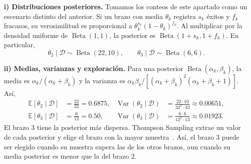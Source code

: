 \textbf{i) Distribuciones posteriores.}
Tomamos los conteos de este apartado como un escenario distinto del
anterior. Si un brazo con media $\theta_k$ registra $s_k$ éxitos y
$f_k$ fracasos, su verosimilitud es proporcional a
$\theta_k^{s_k}(1-\theta_k)^{f_k}$. Al multiplicar por la densidad
uniforme de $\operatorname{Beta}(1,1)$, la posterior es
$\operatorname{Beta}(1+s_k,1+f_k)$. En particular,
\[
    \theta_2\mid\mathcal{D}\sim\operatorname{Beta}(22,10),
    \qquad
    \theta_3\mid\mathcal{D}\sim\operatorname{Beta}(6,6).
\]

\textbf{ii) Medias, varianzas y exploración.}
Para una posterior $\operatorname{Beta}(\alpha_k,\beta_k)$, la media
es $\alpha_k/(\alpha_k+\beta_k)$ y la varianza es
$\alpha_k\beta_k/[(\alpha_k+\beta_k)^2(\alpha_k+\beta_k+1)]$. Así,
\begin{align*}
    \mathbb{E}[\theta_2\mid\mathcal{D}]&=\frac{22}{32}=0.6875,
    &\operatorname{Var}(\theta_2\mid\mathcal{D})
    &=\frac{22\cdot 10}{32^2\cdot 33}\approx 0.00651,\\
    \mathbb{E}[\theta_3\mid\mathcal{D}]&=\frac{6}{12}=0.50,
    &\operatorname{Var}(\theta_3\mid\mathcal{D})
    &=\frac{6\cdot 6}{12^2\cdot 13}\approx 0.01923.
\end{align*}
El brazo $3$ tiene la posterior más dispersa. Thompson Sampling
extrae un valor de cada posterior y elige el brazo con la mayor
muestra~\cite[cap.~36]{lattimore2020}. Así, el brazo $3$ puede ser
elegido cuando su muestra supera las de los otros brazos, aun
cuando su media posterior es menor que la del brazo $2$.
